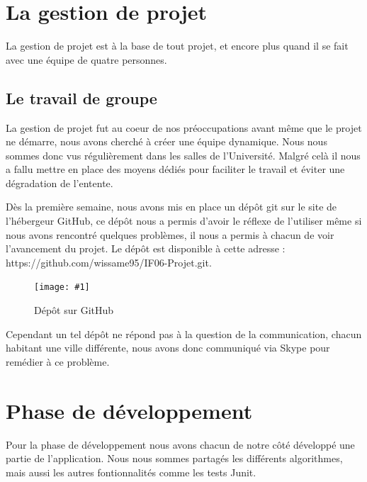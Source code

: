 ﻿\documentclass[a4paper,twoside,12pt]{report}
\newcommand{\monimage}[4]{
\par\noindent
\begin{figure}[H] %
\begin{center}
\texttt{[image: \#1]} %
\caption{#2} %
\label{#3} %
\end{center}
\end{figure} %
}
\begin{document}
\chapter{La gestion de projet}
%
\par
La gestion de projet est à la base de tout projet, et encore plus quand il se 
fait avec une équipe de quatre personnes.
\section{Le travail de groupe}
%
\par
La gestion de projet fut au coeur de nos préoccupations avant même que le projet 
ne démarre, nous avons cherché à créer une équipe dynamique. Nous nous sommes 
donc vus régulièrement dans les salles de l'Université. Malgré celà il nous a 
fallu mettre en place des moyens dédiés pour faciliter le travail et éviter une 
dégradation de l'entente.
\par\noindent
 Dès la première semaine, nous avons mis en place un dépôt git sur le site de 
l'hébergeur GitHub, ce dépôt nous a permis d'avoir le réflexe de l'utiliser même 
 si nous avons rencontré quelques problèmes, il nous a permis à chacun de voir 
l'avancement du projet. Le dépôt est disponible à cette adresse : https://github.com/wissame95/IF06-Projet.git.
\monimage{DepotGit.png}{Dépôt sur GitHub}{depot}{0.8}
\par\noindent
 Cependant un tel dépôt ne répond pas à la question de la communication, chacun 
habitant une ville différente, nous avons donc communiqué via Skype pour 
remédier à ce problème.

\chapter{Phase de développement}
%
\par
Pour la phase de développement nous avons chacun de notre côté développé une 
partie de l'application. Nous nous sommes partagés les différents 
algorithmes, mais aussi les autres fontionnalités comme les tests Junit.
\end{document}
